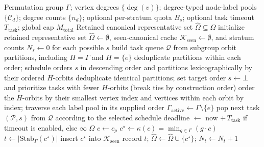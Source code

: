 \documentclass[a5paper, 10pt]{article}
\begin{document}
\begin{algorithm}
\caption{Subgroup-Lattice Descent}
\label{alg:enum}
\scriptsize
\begin{algorithmic}[1]
\Require Permutation group $\Gamma$; vertex degrees $\{\deg(v)\}$; degree-typed node-label pools $\{\mathcal{C}_d\}$; degree counts $\{n_d\}$; optional per-stratum quota $B_s$; optional task timeout $T_{\mathrm{task}}$; global cap $M_{\mathrm{total}}$
\Ensure Retained canonical representative set $\widehat{\Omega}\subseteq\Omega$
\State initialize retained representative set $\widehat{\Omega}\gets\emptyset$, seen-canonical cache $\mathcal{K}_{\mathrm{seen}}\gets\emptyset$, and stratum counts $N_s\gets 0$ for each possible $s$
\State build task queue $\mathcal{Q}$ from subgroup orbit partitions, including $H=\Gamma$ and $H=\{e\}$
    \State deduplicate partitions within each order; schedule orders $s$ in descending order and partitions lexicographically by their ordered $H$-orbits
\Else
    \State deduplicate identical partitions; set target order $s\gets\bot$ and prioritize tasks with fewer $H$-orbits (break ties by construction order)
\EndIf
\State order the $H$-orbits by their smallest vertex index and vertices within each orbit by index; traverse each label pool in its supplied order
\State $\Gamma_{\mathrm{active}} \gets \Gamma\setminus\{e\}$
    \State pop next task $(\mathcal{P},s)$ from $\mathcal{Q}$ according to the selected schedule
        \State deadline $\gets$ now $+\,T_{\mathrm{task}}$ if timeout is enabled, else $\infty$
        \State {}
    \EndIf
\EndWhile
\State \Return $\widehat{\Omega}$
\Statex
{}
        \State \Return
    \EndIf
        \State $c\gets c_p$ 
        \State $c^{\star} \gets \kappa(c)=\min_{g \in \Gamma} (g \cdot c)$
        \State $t \gets |\mathrm{Stab}_{\Gamma}(c^{\star})|$
            \State insert $c^{\star}$ into $\mathcal{K}_{\mathrm{seen}}$
                \State record $t$; $\widehat{\Omega} \gets \widehat{\Omega} \cup \{c^{\star}\}$; $N_t\gets N_t+1$

\end{algorithmic}
\end{algorithm}
\end{document}
